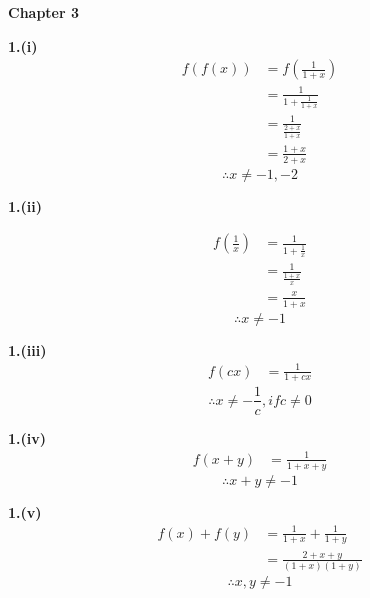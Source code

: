 \documentclass[a4paper,12pt]{report}
\begin{document}
\pagebreak
\noindent
\textbf{Chapter 3}

\noindent
\textbf{1.(i)}
\begin{align*}
f(f(x))
&=f(\frac{1}{1+x})\\
&=\frac{1}{1+\frac{1}{1+x}}\\
&=\frac{1}{\frac{2+x}{1+x}}\\
&=\frac{1+x}{2+x}
\end{align*}
\[\therefore x\neq -1,-2\]

\noindent
\textbf{1.(ii)}

\begin{align*}
f(\frac{1}{x})
&=\frac{1}{1+\frac{1}{x}}\\
&=\frac{1}{\frac{1+x}{x}}\\
&=\frac{x}{1+x}
\end{align*}
\[\therefore x\neq -1\]

\noindent
\textbf{1.(iii)}
\begin{align*}
f(cx)
&=\frac{1}{1+cx}
\end{align*}
\[\therefore x\neq -\frac{1}{c}, if c\neq 0\]

\noindent
\textbf{1.(iv)}
\begin{align*}
f(x+y)
&=\frac{1}{1+x+y}
\end{align*}
\[\therefore x+y\neq -1\]

\noindent
\textbf{1.(v)}
\begin{align*}
f(x)+f(y)
&=\frac{1}{1+x}+\frac{1}{1+y}\\
&=\frac{2+x+y}{(1+x)(1+y)}
\end{align*}
\[\therefore x,y\neq -1\]
\end{document}
